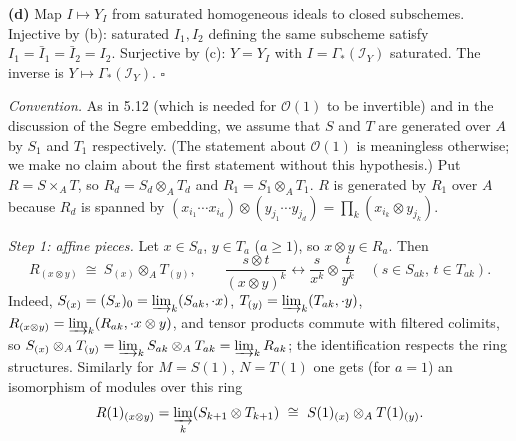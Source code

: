 \documentclass[11pt]{article}
\begin{document}
\textbf{(d)} Map $I\mapsto Y_I$ from saturated homogeneous ideals to closed subschemes. Injective by (b): saturated $I_1,I_2$ defining the same subscheme satisfy $I_1=\bar I_1=\bar I_2=I_2$. Surjective by (c): $Y=Y_{I}$ with $I=\Gamma_*(\mathcal I_Y)$ saturated. The inverse is $Y\mapsto\Gamma_*(\mathcal I_Y)$. \hfill$\square$

\pf
\emph{Convention.} As in 5.12 (which is needed for $\mathcal O(1)$ to be invertible) and in the discussion of the Segre embedding, we assume that $S$ and $T$ are generated over $A$ by $S_1$ and $T_1$ respectively. (The statement about $\mathcal O(1)$ is meaningless otherwise; we make no claim about the first statement without this hypothesis.) Put $R=S\times_AT$, so $R_d=S_d\otimes_AT_d$ and $R_1=S_1\otimes_AT_1$. $R$ is generated by $R_1$ over $A$ because $R_d$ is spanned by $(x_{i_1}\cdots x_{i_d})\otimes(y_{j_1}\cdots y_{j_d})=\prod_k(x_{i_k}\otimes y_{j_k})$.

\emph{Step 1: affine pieces.} Let $x\in S_a$, $y\in T_a$ ($a\ge1$), so $x\otimes y\in R_a$. Then
\[
R_{(x\otimes y)}\ \cong\ S_{(x)}\otimes_AT_{(y)},\qquad \frac{s\otimes t}{(x\otimes y)^k}\leftrightarrow\frac s{x^k}\otimes\frac t{y^k}\quad(s\in S_{ak},\,t\in T_{ak}).
\]
Indeed, $S_{(x)}=(S_x)_0=\varinjlim_k(S_{ak},\cdot x)$, $T_{(y)}=\varinjlim_k(T_{ak},\cdot y)$, $R_{(x\otimes y)}=\varinjlim_k(R_{ak},\cdot x\otimes y)$, and tensor products commute with filtered colimits, so $S_{(x)}\otimes_AT_{(y)}=\varinjlim_k S_{ak}\otimes_AT_{ak}=\varinjlim_kR_{ak}$; the identification respects the ring structures. Similarly for $M=S(1)$, $N=T(1)$ one gets (for $a=1$) an isomorphism of modules over this ring
\[
R(1)_{(x\otimes y)}=\varinjlim_k(S_{k+1}\otimes T_{k+1})\ \cong\ S(1)_{(x)}\otimes_AT(1)_{(y)}.
\]
\end{document}

